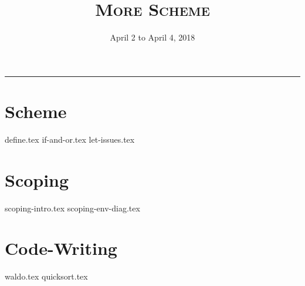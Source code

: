 \documentclass{exam}
\title{\textsc{More Scheme}}
\date{April 2 to April 4, 2018}
\begin{document}
\maketitle
\rule{\textwidth}{0.15em}
\fontsize{12}{15}\selectfont


\section{Scheme}
\begin{questions}
{define.tex}
{if-and-or.tex}
{let-issues.tex}
\end{questions}

\newpage
\section{Scoping}
\begin{questions}
{scoping-intro.tex}
{scoping-env-diag.tex}
\end{questions}

\newpage
\section{Code-Writing}
\begin{questions}
{waldo.tex}
\newpage
{quicksort.tex}
\end{questions}
\end{document}

